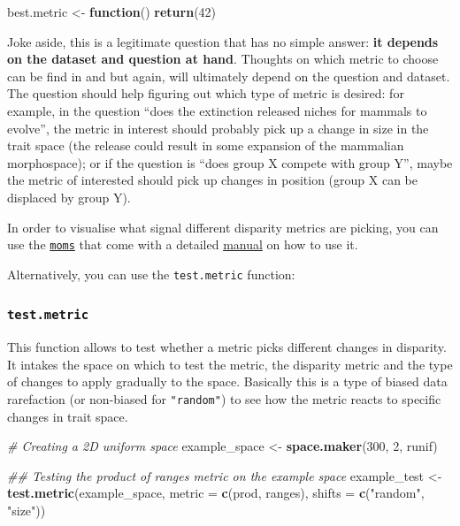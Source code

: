 \documentclass[
]{book}
\newenvironment{Shaded}{\begin{snugshade}}{\end{snugshade}}
\newcommand{\CommentTok}[1]{\textcolor[rgb]{0.56,0.35,0.01}{\textit{#1}}}
\newcommand{\ControlFlowTok}[1]{\textcolor[rgb]{0.13,0.29,0.53}{\textbf{#1}}}
\newcommand{\DataTypeTok}[1]{\textcolor[rgb]{0.13,0.29,0.53}{#1}}
\newcommand{\DecValTok}[1]{\textcolor[rgb]{0.00,0.00,0.81}{#1}}
\newcommand{\KeywordTok}[1]{\textcolor[rgb]{0.13,0.29,0.53}{\textbf{#1}}}
\newcommand{\NormalTok}[1]{#1}
\newcommand{\StringTok}[1]{\textcolor[rgb]{0.31,0.60,0.02}{#1}}
\begin{document}
\begin{Shaded}
\begin{Highlighting}[]
\NormalTok{best.metric \textless{}{-}}\StringTok{ }\ControlFlowTok{function}\NormalTok{() }\KeywordTok{return}\NormalTok{(}\DecValTok{42}\NormalTok{)}
\end{Highlighting}
\end{Shaded}

Joke aside, this is a legitimate question that has no simple answer: \textbf{it depends on the dataset and question at hand}.
Thoughts on which metric to choose can be find in \citet{moms} and \citet{Guillerme2020} but again, will ultimately depend on the question and dataset.
The question should help figuring out which type of metric is desired: for example, in the question ``does the extinction released niches for mammals to evolve'', the metric in interest should probably pick up a change in size in the trait space (the release could result in some expansion of the mammalian morphospace); or if the question is ``does group X compete with group Y'', maybe the metric of interested should pick up changes in position (group X can be displaced by group Y).

In order to visualise what signal different disparity metrics are picking, you can use the \href{https://tguillerme.shinyapps.io/moms/}{\texttt{moms}} that come with a detailed \href{https://rawcdn.githack.com/TGuillerme/moms/master/inst/moms_vignette.html}{manual} on how to use it.

Alternatively, you can use the \texttt{test.metric} function:

\hypertarget{test-metric}{%
\subsubsection{\texorpdfstring{\texttt{test.metric}}{test.metric}}\label{test-metric}}

This function allows to test whether a metric picks different changes in disparity. It intakes the space on which to test the metric, the disparity metric and the type of changes to apply gradually to the space.
Basically this is a type of biased data rarefaction (or non-biased for \texttt{"random"}) to see how the metric reacts to specific changes in trait space.

\begin{Shaded}
\begin{Highlighting}[]
\CommentTok{\# Creating a 2D uniform space}
\NormalTok{example\_space \textless{}{-}}\StringTok{ }\KeywordTok{space.maker}\NormalTok{(}\DecValTok{300}\NormalTok{, }\DecValTok{2}\NormalTok{, runif)}

\CommentTok{\#\# Testing the product of ranges metric on the example space}
\NormalTok{example\_test \textless{}{-}}\StringTok{ }\KeywordTok{test.metric}\NormalTok{(example\_space, }\DataTypeTok{metric =} \KeywordTok{c}\NormalTok{(prod, ranges),}
                           \DataTypeTok{shifts =} \KeywordTok{c}\NormalTok{(}\StringTok{"random"}\NormalTok{, }\StringTok{"size"}\NormalTok{)) }
\end{Highlighting}
\end{Shaded}
\end{document}
